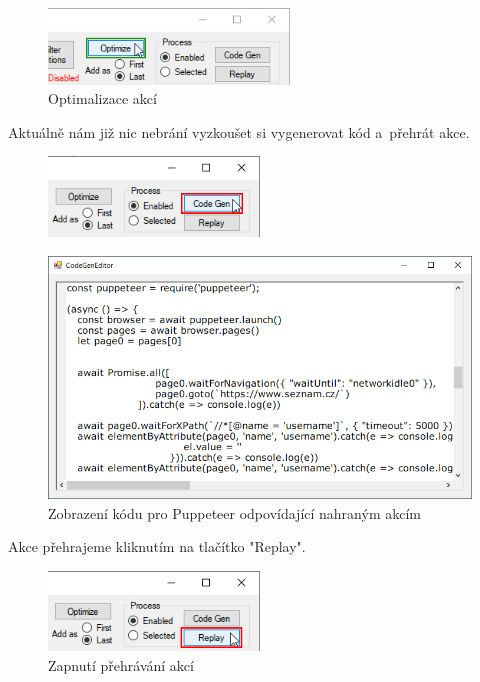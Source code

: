 \documentclass[12pt, a4paper, twoside]{article}
\begin{document}
	\begin{figure}[H]
	\centering
	\includegraphics[width=0.57\textwidth, center]{optimizeClick.png}
	\caption{Optimalizace akcí}
	\end{figure}
	\newpage
	Aktuálně nám již nic nebrání vyzkoušet si vygenerovat kód a~přehrát akce. 
	\begin{figure}[H]
		\centering
		\includegraphics[width=0.50\textwidth]{codeGenButton.png}
	\end{figure}
	\vspace{-0.7cm}
	\begin{figure}[H]
		\centering
		\textdownarrow
	\end{figure}
	\vspace{-0.6cm}
	\begin{figure}[H]
		\centering
		\includegraphics[width=1.0\textwidth]{codeGenEditor.png}
		\caption{Zobrazení kódu pro Puppeteer odpovídající nahraným akcím}
	\end{figure}
	Akce přehrajeme kliknutím na tlačítko "Replay". 
	\begin{figure}[H]
		\centering
		\includegraphics[width=0.50\textwidth]{replayButton.png}
		\caption{Zapnutí přehrávání akcí}
	\end{figure}
\end{document}
